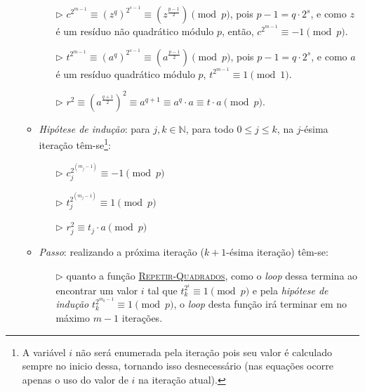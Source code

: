 \begin{enumerate}
\begin{itemize}
        \begin{itemize}
                \item[$\triangleright$] $c^{2^{m-1}} \equiv (z^q)^{2^{s-1}} \equiv (z^{\frac{p-1}{2}}) \pmod{p}$, pois $p - 1 = q\cdot2^{s}$, e como $z$ é um resíduo não quadrático módulo $p$, então, $c^{2^{m-1}} \equiv -1 \pmod{p}$.
                \vspace{4mm}
                \item[$\triangleright$] $t^{2^{m-1}} \equiv (a^q)^{2^{s-1}} \equiv (a^{\frac{p-1}{2}})\pmod{p}$, pois $p - 1 = q\cdot2^{s}$, e como $a$ é um resíduo quadrático módulo $p$,
                $t^{2^{m-1}} \equiv 1 \pmod{1}$.
                \vspace{4mm}
                \item[$\triangleright$] $r^2 \equiv (a^{\frac{q + 1}{2}})^2 \equiv a^{q + 1} \equiv a^{q} \cdot a \equiv t \cdot a \pmod{p}$.
        \end{itemize}        
        \item \textit{Hipótese de indução}: para $j, k \in \mathbb{N}$, para todo $0 \leq j \leq k$, na $j$-ésima iteração têm-se\footnote{A variável $i$ não será enumerada pela iteração pois seu valor é calculado sempre no inicio dessa, tornando isso desnecessário (nas equações ocorre apenas o uso do valor de $i$ na iteração atual).}:
            \begin{itemize}
                \item[$\triangleright$] $c_{j}^{2^{(m_j -1)}} \equiv -1 \pmod{p}$
                \vspace{4mm}
                \item[$\triangleright$] $t_{j}^{2^{(m_j -1)}} \equiv 1 \pmod{p}$
                \vspace{4mm}
                \item[$\triangleright$] $r_{j}^2 \equiv t_j \cdot a \pmod{p}$
            \end{itemize}
        \item \textit{Passo}: realizando a próxima iteração ($k+1$-ésima iteração) têm-se:
            \begin{itemize}
                \item[$\triangleright$] quanto a função \hyperref[algo:repeatsquaring]{\textsc{Repetir-Quadrados}}, como o \textit{loop} dessa termina ao encontrar um valor $i$ tal que $t_{k}^{2^{i}} \equiv 1 \pmod{p}$ e pela \textit{hipótese de indução} $t_{k}^{2^{m_{k}-1}} \equiv 1 \pmod{p}$, o \textit{loop} desta função irá terminar em no máximo $m-1$ iterações.

\end{itemize}
\end{itemize}
\end{enumerate}
